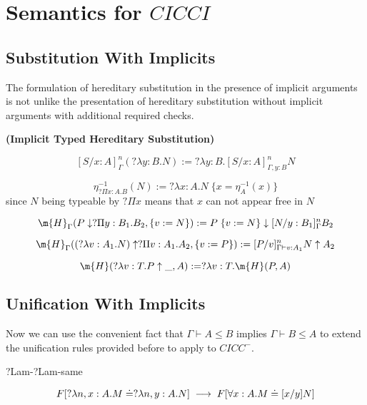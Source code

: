 \section{Semantics for $CICCI$}


\subsection{Substitution With Implicits}

The formulation of hereditary substitution in the presence of 
implicit arguments is not unlike the presentation of
hereditary substitution without implicit arguments with
additional required checks.

\begin{definition}
\textbf{(Implicit Typed Hereditary Substitution)}


\[
[S / x : A]^n_{\Gamma } (?\lambda y : B . N) := ?\lambda y:B . [S / x : A]^n_{\Gamma, y : B} N
\] 

\[
\eta^{-1}_{?\Pi x : A . B}(N) := ?\lambda x : A . N \; \{ x = \eta^{-1}_A(x) \}
\] since $N$ being typeable by $?\Pi x $ means that $x$ can not appear free in $N$

\[
\m{H}_{\Gamma}(P \downarrow ?\Pi y : B_1 . B_2 , \{ v := N \} ) := P\; \{ v := N \} \downarrow [N/y : B_1]^n_{\Gamma}B_2
\]

\[
\m{H}_{\Gamma} ((?\lambda v : A_1 . N) \uparrow ?\Pi v : A_1 . A_2 , \{ v := P \}) 
:= [P/v]^n_{\Gamma \vdash v : A_1} N \uparrow A_2
\]

\[ 
\m{H}(?\lambda v : T . P \uparrow \_ , A) := ?\lambda v : T . \m{H}(P,A)
\]

\label{def:hered}
\end{definition}



\subsection{Unification With Implicits}

Now we can use the convenient fact that $\Gamma \vdash A  \leq B$ implies $\Gamma \vdash B \leq A$ to 
extend the unification rules provided before to apply to $CICC^-$.

\setcounter{tcase}{0}

\begin{tcase}
?Lam-?Lam-same
\end{tcase}


\[
F[?\lambda n,x : A . M \doteq ?\lambda n,y : A . N ]
\;\longrightarrow\;
F[ \forall x : A . M \doteq [x/y]N ]
\]

